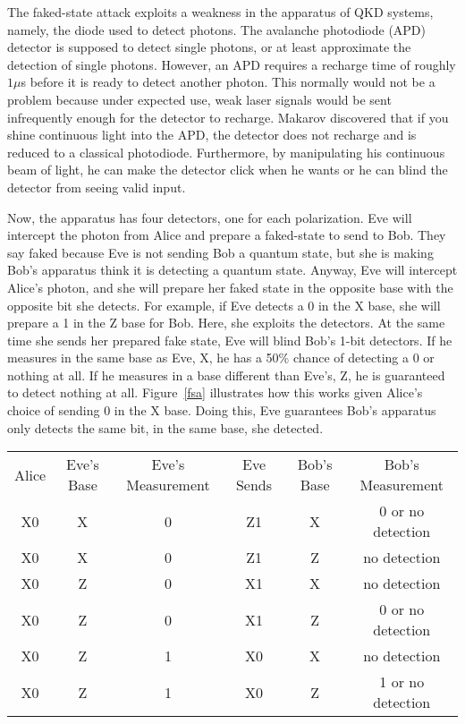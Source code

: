 \documentclass[12pt,twocolumn]{article}
\begin{document}
The faked-state attack exploits a weakness in the apparatus of QKD systems, namely, the diode used to detect photons\cite{makarov:06,makarov:09}. The avalanche photodiode (APD) detector is supposed to detect single photons, or at least approximate the detection of single photons. However, an APD requires a recharge time of roughly $1\mu$s before it is ready to detect another photon. This normally would not be a problem because under expected use, weak laser signals would be sent infrequently enough for the detector to recharge. Makarov discovered that if you shine continuous light into the APD, the detector does not recharge and is reduced to a classical photodiode. Furthermore, by manipulating his continuous beam of light, he can make the detector click when he wants or he can blind the detector from seeing valid input.

Now, the apparatus has four detectors, one for each polarization. Eve will intercept the photon from Alice and prepare a faked-state to send to Bob. They say faked because Eve is not sending Bob a quantum state, but she is making Bob's apparatus think it is detecting a quantum state. Anyway, Eve will intercept Alice's photon, and she will prepare her faked state in the opposite base with the opposite bit she detects. For example, if Eve detects a 0 in the X base, she will prepare a 1 in the Z base for Bob. Here, she exploits the detectors. At the same time she sends her prepared fake state, Eve will blind Bob's 1-bit detectors. If he measures in the same base as Eve, X, he has a 50\% chance of detecting a 0 or nothing at all. If he measures in a base different than Eve's, Z, he is guaranteed to detect nothing at all. Figure~\ref{fsa} illustrates how this works given Alice's choice of sending 0 in the X base. Doing this, Eve guarantees Bob's apparatus only detects the same bit, in the same base, she detected.
\begin{table*}[tbp] \centering
\begin{tabular}{|c c c c c c|}
\hline
Alice & Eve's Base & Eve's Measurement & Eve Sends & Bob's Base & Bob's Measurement\\
X0 & X & 0 & Z1 & X & 0 or no detection\\
X0 & X & 0 & Z1 & Z & no detection\\
X0 & Z & 0 & X1 & X & no detection\\
X0 & Z & 0 & X1 & Z & 0 or no detection\\
X0 & Z & 1 & X0 & X & no detection\\
X0 & Z & 1 & X0 & Z & 1 or no detection\\
\hline
\end{tabular}
\caption[Eve's faked-stage attack]{Eve's faked-stage attack. Note Eve's measurement in the bottom for has a 50\% chance of detecting a 0 or a 1 since she uses an incompatible base to Alice's base.\label{fsa}}
\end{table*}
\end{document}
